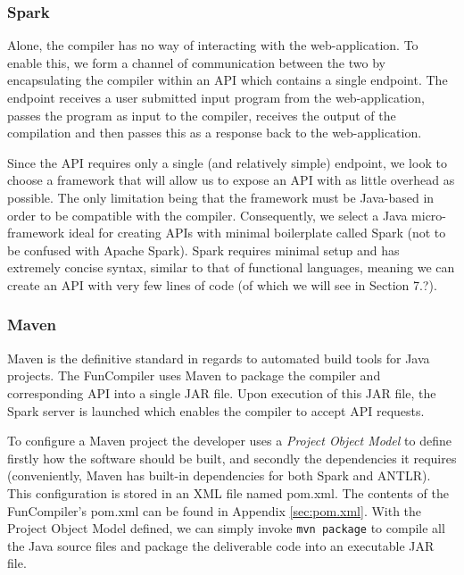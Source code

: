 \documentclass{l4proj}
\begin{document}
\subsubsection{Spark}
\label{sec:spark}
Alone, the compiler has no way of interacting with the web-application. To enable this, we form a channel of communication between the two by encapsulating the compiler within an API which contains a single endpoint. The endpoint receives a user submitted input program from the web-application, passes the program as input to the compiler, receives the output of the compilation and then passes this as a response back to the web-application.

Since the API requires only a single (and relatively simple) endpoint, we look to choose a framework that will allow us to expose an API with as little overhead as possible. The only limitation being that the framework must be Java-based in order to be compatible with the compiler. Consequently, we select a Java micro-framework ideal for creating APIs with minimal boilerplate called Spark (not to be confused with Apache Spark). Spark requires minimal setup and has extremely concise syntax, similar to that of functional languages, meaning we can create an API with very few lines of code (of which we will see in Section 7.?).

\subsubsection{Maven}
Maven is the definitive standard in regards to automated build tools for Java projects. The FunCompiler uses Maven to package the compiler and corresponding API into a single JAR file. Upon execution of this JAR file, the Spark server is launched which enables the compiler to accept API requests.

To configure a Maven project the developer uses a \textit{Project Object Model} to define firstly how the software should be built, and secondly the dependencies it requires (conveniently, Maven has built-in dependencies for both Spark and ANTLR). This configuration is stored in an XML file named \textsf{pom.xml}. The contents of the FunCompiler's \textsf{pom.xml} can be found in Appendix \ref{sec:pom.xml}. With the Project Object Model defined, we can simply invoke  \texttt{mvn package} to compile all the Java source files and package the deliverable code into an executable JAR file. 
\end{document}
